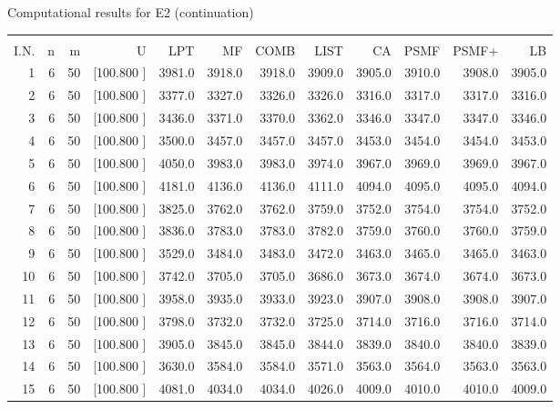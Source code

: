 \documentclass[12pt,a4paper]{article}
\begin{document}
\begin{center}
 Computational results for E2 (continuation) {\tiny
\begin{tabular}{r r r r r r r r r r r r}\hline
    &   &   &          &        &        &        &        &        &        &        &       \\[-0.1in]
  I.N.  &  n  &  m  &  U  &  LPT  &  MF  &  COMB  &  LIST  &  CA  & PSMF &PSMF+ & LB \\[0.03in]
\hline
   1&  6& 50&[100.800   ]&  3981.0&  3918.0&  3918.0&  3909.0&  3905.0&  3910.0&  3908.0&  3905.0\\[-0.02in]
   2&  6& 50&[100.800   ]&  3377.0&  3327.0&  3326.0&  3326.0&  3316.0&  3317.0&  3317.0&  3316.0\\[-0.02in]
   3&  6& 50&[100.800   ]&  3436.0&  3371.0&  3370.0&  3362.0&  3346.0&  3347.0&  3347.0&  3346.0\\[-0.02in]
   4&  6& 50&[100.800   ]&  3500.0&  3457.0&  3457.0&  3457.0&  3453.0&  3454.0&  3454.0&  3453.0\\[-0.02in]
   5&  6& 50&[100.800   ]&  4050.0&  3983.0&  3983.0&  3974.0&  3967.0&  3969.0&  3969.0&  3967.0\\[-0.02in]
   6&  6& 50&[100.800   ]&  4181.0&  4136.0&  4136.0&  4111.0&  4094.0&  4095.0&  4095.0&  4094.0\\[-0.02in]
   7&  6& 50&[100.800   ]&  3825.0&  3762.0&  3762.0&  3759.0&  3752.0&  3754.0&  3754.0&  3752.0\\[-0.02in]
   8&  6& 50&[100.800   ]&  3836.0&  3783.0&  3783.0&  3782.0&  3759.0&  3760.0&  3760.0&  3759.0\\[-0.02in]
   9&  6& 50&[100.800   ]&  3529.0&  3484.0&  3483.0&  3472.0&  3463.0&  3465.0&  3465.0&  3463.0\\[-0.02in]
  10&  6& 50&[100.800   ]&  3742.0&  3705.0&  3705.0&  3686.0&  3673.0&  3674.0&  3674.0&  3673.0\\[-0.02in]
  11&  6& 50&[100.800   ]&  3958.0&  3935.0&  3933.0&  3923.0&  3907.0&  3908.0&  3908.0&  3907.0\\[-0.02in]
  12&  6& 50&[100.800   ]&  3798.0&  3732.0&  3732.0&  3725.0&  3714.0&  3716.0&  3716.0&  3714.0\\[-0.02in]
  13&  6& 50&[100.800   ]&  3905.0&  3845.0&  3845.0&  3844.0&  3839.0&  3840.0&  3840.0&  3839.0\\[-0.02in]
  14&  6& 50&[100.800   ]&  3630.0&  3584.0&  3584.0&  3571.0&  3563.0&  3564.0&  3563.0&  3563.0\\[-0.02in]
  15&  6& 50&[100.800   ]&  4081.0&  4034.0&  4034.0&  4026.0&  4009.0&  4010.0&  4010.0&  4009.0\\[-0.02in]

\end{tabular}}
\end{center}
\end{document}
